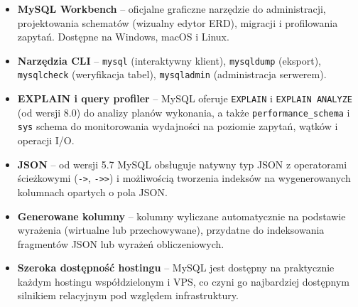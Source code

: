 \begin{itemize}
    \item \textbf{MySQL Workbench} -- oficjalne graficzne narzędzie do
    administracji, projektowania schematów (wizualny edytor ERD), migracji
    i profilowania zapytań. Dostępne na Windows, macOS i Linux.
    \item \textbf{Narzędzia CLI} -- \texttt{mysql} (interaktywny klient),
    \texttt{mysqldump} (eksport), \texttt{mysqlcheck} (weryfikacja tabel),
    \texttt{mysqladmin} (administracja serwerem).
    \item \textbf{EXPLAIN i query profiler} -- MySQL oferuje \texttt{EXPLAIN}
    i \texttt{EXPLAIN ANALYZE} (od wersji 8.0) do analizy planów wykonania,
    a także \texttt{performance\_schema} i \texttt{sys} schema do
    monitorowania wydajności na poziomie zapytań, wątków i operacji I/O.
    \item \textbf{JSON} -- od wersji 5.7 MySQL obsługuje natywny typ JSON
    z operatorami ścieżkowymi (\texttt{->}, \texttt{->>}) i możliwością
    tworzenia indeksów na wygenerowanych kolumnach opartych o pola JSON.
    \item \textbf{Generowane kolumny} -- kolumny wyliczane automatycznie
    na podstawie wyrażenia (wirtualne lub przechowywane), przydatne do
    indeksowania fragmentów JSON lub wyrażeń obliczeniowych.
    \item \textbf{Szeroka dostępność hostingu} -- MySQL jest dostępny
    na praktycznie każdym hostingu współdzielonym i VPS, co czyni go
    najbardziej dostępnym silnikiem relacyjnym pod względem infrastruktury.
\end{itemize}